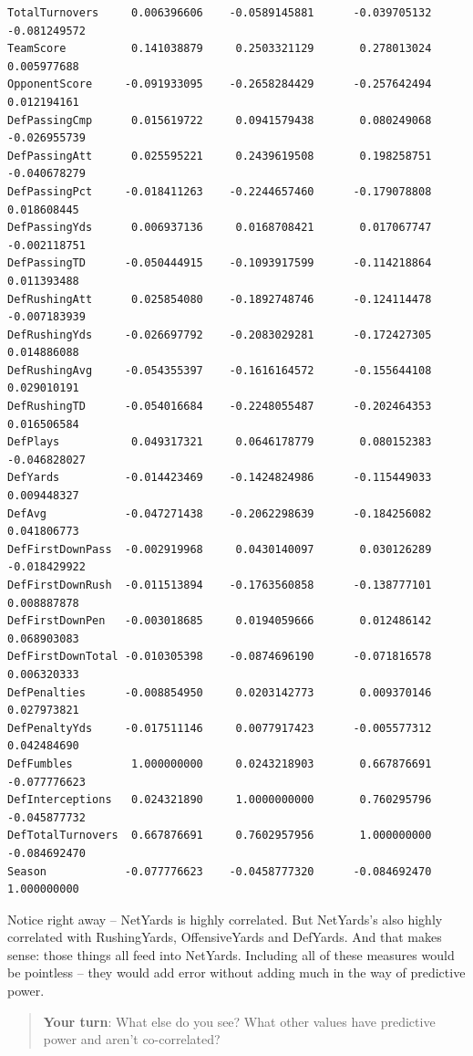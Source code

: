 \documentclass[
  letterpaper,
  DIV=11,
  numbers=noendperiod]{scrreprt}
\begin{document}
\begin{verbatim}
TotalTurnovers     0.006396606    -0.0589145881      -0.039705132 -0.081249572
TeamScore          0.141038879     0.2503321129       0.278013024  0.005977688
OpponentScore     -0.091933095    -0.2658284429      -0.257642494  0.012194161
DefPassingCmp      0.015619722     0.0941579438       0.080249068 -0.026955739
DefPassingAtt      0.025595221     0.2439619508       0.198258751 -0.040678279
DefPassingPct     -0.018411263    -0.2244657460      -0.179078808  0.018608445
DefPassingYds      0.006937136     0.0168708421       0.017067747 -0.002118751
DefPassingTD      -0.050444915    -0.1093917599      -0.114218864  0.011393488
DefRushingAtt      0.025854080    -0.1892748746      -0.124114478 -0.007183939
DefRushingYds     -0.026697792    -0.2083029281      -0.172427305  0.014886088
DefRushingAvg     -0.054355397    -0.1616164572      -0.155644108  0.029010191
DefRushingTD      -0.054016684    -0.2248055487      -0.202464353  0.016506584
DefPlays           0.049317321     0.0646178779       0.080152383 -0.046828027
DefYards          -0.014423469    -0.1424824986      -0.115449033  0.009448327
DefAvg            -0.047271438    -0.2062298639      -0.184256082  0.041806773
DefFirstDownPass  -0.002919968     0.0430140097       0.030126289 -0.018429922
DefFirstDownRush  -0.011513894    -0.1763560858      -0.138777101  0.008887878
DefFirstDownPen   -0.003018685     0.0194059666       0.012486142  0.068903083
DefFirstDownTotal -0.010305398    -0.0874696190      -0.071816578  0.006320333
DefPenalties      -0.008854950     0.0203142773       0.009370146  0.027973821
DefPenaltyYds     -0.017511146     0.0077917423      -0.005577312  0.042484690
DefFumbles         1.000000000     0.0243218903       0.667876691 -0.077776623
DefInterceptions   0.024321890     1.0000000000       0.760295796 -0.045877732
DefTotalTurnovers  0.667876691     0.7602957956       1.000000000 -0.084692470
Season            -0.077776623    -0.0458777320      -0.084692470  1.000000000
\end{verbatim}

Notice right away -- NetYards is highly correlated. But NetYards's also
highly correlated with RushingYards, OffensiveYards and DefYards. And
that makes sense: those things all feed into NetYards. Including all of
these measures would be pointless -- they would add error without adding
much in the way of predictive power.

\begin{quote}
\textbf{Your turn}: What else do you see? What other values have
predictive power and aren't co-correlated?
\end{quote}
\end{document}
